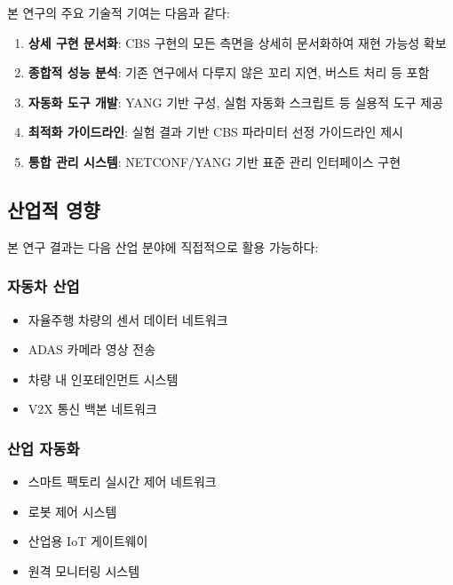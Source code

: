 \documentclass[twocolumn,10pt]{article}
\begin{document}
본 연구의 주요 기술적 기여는 다음과 같다:

\begin{enumerate}
    \item \textbf{상세 구현 문서화}: CBS 구현의 모든 측면을 상세히 문서화하여 재현 가능성 확보
    
    \item \textbf{종합적 성능 분석}: 기존 연구에서 다루지 않은 꼬리 지연, 버스트 처리 등 포함
    
    \item \textbf{자동화 도구 개발}: YANG 기반 구성, 실험 자동화 스크립트 등 실용적 도구 제공
    
    \item \textbf{최적화 가이드라인}: 실험 결과 기반 CBS 파라미터 선정 가이드라인 제시
    
    \item \textbf{통합 관리 시스템}: NETCONF/YANG 기반 표준 관리 인터페이스 구현
\end{enumerate}

\subsection{산업적 영향}

본 연구 결과는 다음 산업 분야에 직접적으로 활용 가능하다:

\subsubsection{자동차 산업}

\begin{itemize}
    \item 자율주행 차량의 센서 데이터 네트워크
    \item ADAS 카메라 영상 전송
    \item 차량 내 인포테인먼트 시스템
    \item V2X 통신 백본 네트워크
\end{itemize}

\subsubsection{산업 자동화}

\begin{itemize}
    \item 스마트 팩토리 실시간 제어 네트워크
    \item 로봇 제어 시스템
    \item 산업용 IoT 게이트웨이
    \item 원격 모니터링 시스템
\end{itemize}
\end{document}
